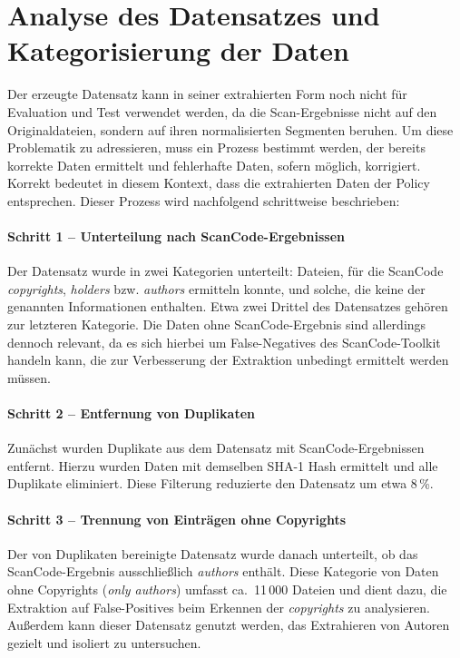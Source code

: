 \section{Analyse des Datensatzes und Kategorisierung der Daten}\label{sec:analyse-datensatz}

Der erzeugte Datensatz kann in seiner extrahierten Form noch nicht für Evaluation und Test verwendet werden, da die Scan-Ergebnisse nicht auf den Originaldateien, sondern auf ihren normalisierten Segmenten beruhen.
Um diese Problematik zu adressieren, muss ein Prozess bestimmt werden, der bereits korrekte Daten ermittelt und fehlerhafte Daten, sofern möglich, korrigiert.
Korrekt bedeutet in diesem Kontext, dass die extrahierten Daten der Policy entsprechen.
Dieser Prozess wird nachfolgend schrittweise beschrieben:

\paragraph{Schritt 1 -- Unterteilung nach ScanCode-Ergebnissen}
Der Datensatz wurde in zwei Kategorien unterteilt: Dateien, für die ScanCode \textit{copyrights}, \textit{holders} bzw. \textit{authors} ermitteln konnte, und solche, die keine der genannten Informationen enthalten.
Etwa zwei Drittel des Datensatzes gehören zur letzteren Kategorie.
Die Daten ohne ScanCode-Ergebnis sind allerdings dennoch relevant, da es sich hierbei um False-Negatives des ScanCode-Toolkit handeln kann, die zur Verbesserung der Extraktion unbedingt ermittelt werden müssen.

\paragraph{Schritt 2 -- Entfernung von Duplikaten}
Zunächst wurden Duplikate aus dem Datensatz mit ScanCode-Ergebnissen entfernt.
Hierzu wurden Daten mit demselben SHA-1 Hash ermittelt und alle Duplikate eliminiert.
Diese Filterung reduzierte den Datensatz um etwa 8\,\%.

\paragraph{Schritt 3 -- Trennung von Einträgen ohne Copyrights}
Der von Duplikaten bereinigte Datensatz wurde danach unterteilt, ob das ScanCode-Ergebnis ausschließlich \textit{authors} enthält.
Diese Kategorie von Daten ohne Copyrights (\textit{only authors}) umfasst ca.\ 11\,000 Dateien und dient dazu, die Extraktion auf False-Positives beim Erkennen der \textit{copyrights} zu analysieren.
Außerdem kann dieser Datensatz genutzt werden, das Extrahieren von Autoren gezielt und isoliert zu untersuchen.

